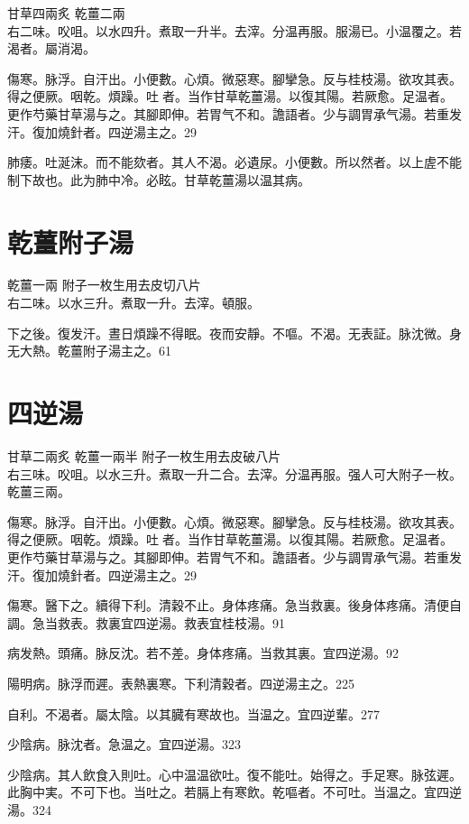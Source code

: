 甘草{\scriptsize 四兩炙} 乾薑{\scriptsize 二兩}\\
右二味。㕮咀。以水四升。煮取一升半。去滓。分温再服。服湯已。小温覆之。若渴者。屬消渴。{\wuben}

傷寒。脉浮。自汗出。小便數。心煩。微惡寒。腳攣急。反与桂枝湯。欲攻其表。得之便厥。咽乾。煩躁。吐{\sungii 𠱘}者。当作甘草乾薑湯。以復其陽。若厥愈。足温者。更作芍藥甘草湯与之。其腳即伸。若胃气不和。譫語者。少与{\khaai 調胃}承气湯。若重发汗。復加燒針者。四逆湯主之。29

肺痿。吐涎沫。而不能欬者。其人不渴。必遺尿。小便數。所以然者。以上虗不能制下故也。此为肺中冷。必眩。甘草乾薑湯以温其病。

\section{乾薑附子湯}

乾薑{\scriptsize 一兩} 附子{\scriptsize 一枚生用去皮切八片}\\
右二味。以水三升。煮取一升。去滓。頓服。

下之後。復发汗。晝日煩躁不得眠。夜而安靜。不嘔。不渴。无表証。脉沈微。身无大熱。乾薑附子湯主之。61

\section{四逆湯}

甘草{\scriptsize 二兩炙} 乾薑{\scriptsize 一兩半} 附子{\scriptsize 一枚生用去皮破八片}\\
右三味。{\khaai 㕮咀。}以水三升。煮取一升二合。去滓。分温再服。强人可大附子一枚。乾薑三兩。

傷寒。脉浮。自汗出。小便數。心煩。微惡寒。腳攣急。反与桂枝湯。欲攻其表。得之便厥。咽乾。煩躁。吐{\sungii 𠱘}者。当作甘草乾薑湯。以復其陽。若厥愈。足温者。更作芍藥甘草湯与之。其腳即伸。若胃气不和。譫語者。少与{\khaai 調胃}承气湯。若重发汗。復加燒針者。四逆湯主之。29

傷寒。醫下之。續得下利。清穀不止。身体疼痛。急当救裏。後身体疼痛。清便自調。急当救表。救裏宜四逆湯。救表宜桂枝湯。91

病发熱。頭痛。脉反沈。若不差。身体疼痛。当救其裏。宜四逆湯。92

{\khaai 陽明病。}脉浮而遲。表熱裏寒。下利清穀者。四逆湯主之。225

自利。不渴者。屬太陰。以其臓有寒故也。当温之。宜四逆輩。277

少陰病。脉沈者。急温之。宜四逆湯。323

少陰病。其人飲食入則吐。心中温温欲吐。復不能吐。始得之。手足寒。脉弦遲。此胸中実。不可下也。当吐之。若膈上有寒飲。乾嘔者。不可吐。当温之。宜四逆湯。324

